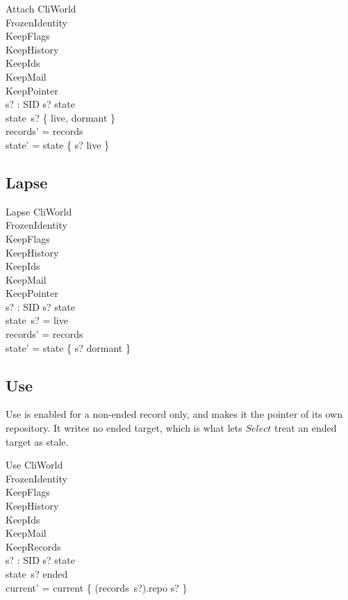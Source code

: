 \documentclass[a4paper,10pt,fleqn]{article}
\begin{document}
\begin{schema}{Attach}
  \Delta CliWorld \\
  FrozenIdentity \\
  KeepFlags \\
  KeepHistory \\
  KeepIds \\
  KeepMail \\
  KeepPointer \\
  s? : SID
  \where
  s? \in \dom state \\
  state~s? \in \{ live, dormant \} \\
  records' = records \\
  state' = state \oplus \{ s? \mapsto live \}
\end{schema}

\subsection{Lapse}

\begin{schema}{Lapse}
  \Delta CliWorld \\
  FrozenIdentity \\
  KeepFlags \\
  KeepHistory \\
  KeepIds \\
  KeepMail \\
  KeepPointer \\
  s? : SID
  \where
  s? \in \dom state \\
  state~s? = live \\
  records' = records \\
  state' = state \oplus \{ s? \mapsto dormant \}
\end{schema}

\subsection{Use}

Use is enabled for a non-ended record only, and makes it the pointer of
its own repository.  It writes no ended target, which is what lets
$Select$ treat an ended target as stale.

\begin{schema}{Use}
  \Delta CliWorld \\
  FrozenIdentity \\
  KeepFlags \\
  KeepHistory \\
  KeepIds \\
  KeepMail \\
  KeepRecords \\
  s? : SID
  \where
  s? \in \dom state \\
  state~s? \neq ended \\
  current' = current \oplus \{ (records~s?).repo \mapsto s? \}
\end{schema}
\end{document}
